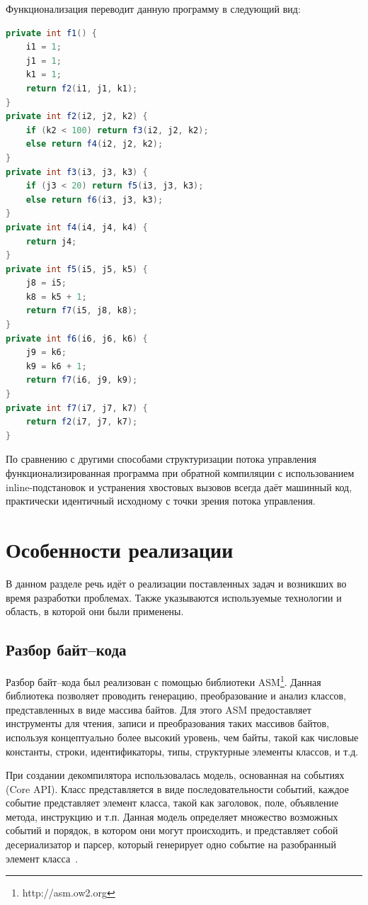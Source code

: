 Функционализация переводит данную программу в следующий вид:\\
\begin{lstlisting}[language = Java]
private int f1() {
	i1 = 1;
	j1 = 1;
	k1 = 1;
	return f2(i1, j1, k1);
}
private int f2(i2, j2, k2) {
	if (k2 < 100) return f3(i2, j2, k2);
	else return f4(i2, j2, k2);	
}
private int f3(i3, j3, k3) {
	if (j3 < 20) return f5(i3, j3, k3);
	else return f6(i3, j3, k3);	
}
private int f4(i4, j4, k4) {
	return j4;
}
private int f5(i5, j5, k5) {
	j8 = i5;
	k8 = k5 + 1;
	return f7(i5, j8, k8);
}
private int f6(i6, j6, k6) {
	j9 = k6;
	k9 = k6 + 1;
	return f7(i6, j9, k9);
}
private int f7(i7, j7, k7) {
	return f2(i7, j7, k7);
}\end{lstlisting}

По сравнению с другими способами структуризации потока управления функционализированная программа при обратной компиляции с использованием inline-подстановок и устранения хвостовых вызовов всегда даёт машинный код, практически идентичный исходному с точки зрения потока управления.

\section{Особенности реализации}

В данном разделе речь идёт о реализации поставленных задач и возникших во время разработки проблемах. Также указываются используемые технологии и область, в которой они были применены.

\subsection{Разбор байт--кода}

Разбор байт--кода был реализован с помощью библиотеки ASM\footnote{http://asm.ow2.org}. Данная библиотека позволяет проводить генерацию, преобразование и анализ классов, представленных в виде массива байтов. Для этого ASM предоставляет инструменты для чтения, записи и преобразования таких массивов байтов, используя концептуально более высокий уровень, чем байты, такой как числовые константы, строки, идентификаторы, типы, структурные элементы классов, и т.д. 	

При создании декомпилятора использовалась модель, основанная на событиях (Core API). Класс представляется в виде последовательности событий, каждое событие представляет элемент класса, такой как заголовок, поле, объявление метода, инструкцию и т.п. Данная модель определяет множество возможных событий и порядок, в котором они могут происходить, и представляет собой десериализатор и парсер, который генерирует одно событие на разобранный элемент класса~\cite{asm}.

